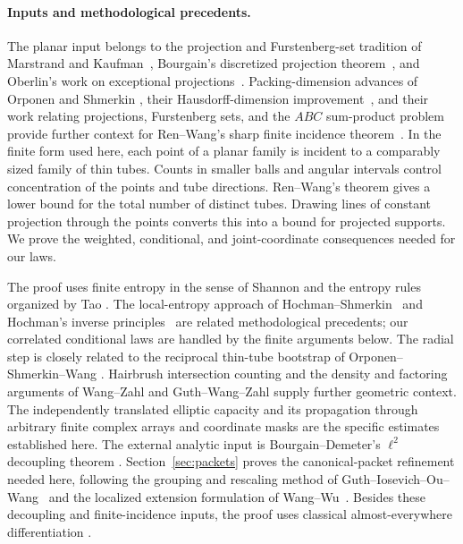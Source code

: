 \paragraph{Inputs and methodological precedents.}
The planar input belongs to the projection and Furstenberg-set
tradition of Marstrand and Kaufman~\cite{Marstrand1954,Kaufman1968},
Bourgain's discretized projection theorem~\cite{Bourgain2010}, and
Oberlin's work on exceptional projections~\cite{Oberlin2012}.
Packing-dimension advances of Orponen and Shmerkin
\cite{Orponen2020Packing,Shmerkin2022Packing}, their Hausdorff-dimension
improvement~\cite{OrponenShmerkin2023Hausdorff}, and their work relating
projections, Furstenberg sets, and the $ABC$ sum-product problem
\cite{OrponenShmerkin2026ABC} provide further context for Ren--Wang's
sharp finite incidence theorem~\cite{RenWang2023}. In the finite form
used here, each point of a planar family is incident to a comparably
sized family of thin tubes. Counts in smaller balls and angular
intervals control concentration of the points and tube directions.
Ren--Wang's theorem gives a lower bound for the total number of
distinct tubes. Drawing lines of constant projection through the
points converts this into a bound for projected supports. We prove
the weighted, conditional, and joint-coordinate consequences needed
for our laws.

The proof uses finite entropy in the sense of Shannon
\cite{Shannon1948} and the entropy rules organized by Tao
\cite{Tao2010Entropy}. The local-entropy approach of
Hochman--Shmerkin~\cite{HochmanShmerkin2012} and Hochman's inverse
principles~\cite{Hochman2014} are related methodological precedents;
our correlated conditional laws are handled by the finite arguments
below. The radial step is closely related to the reciprocal thin-tube
bootstrap of Orponen--Shmerkin--Wang
\cite{OrponenShmerkinWang2024Radial}. Hairbrush intersection counting
\cite{Wolff1995Kakeya,TaoVargasVega1998} and the density and factoring
arguments of Wang--Zahl and Guth--Wang--Zahl
\cite{WangZahl2025Convex,GuthWangZahl2026} supply further geometric
context. The independently translated elliptic capacity and its
propagation through arbitrary finite complex arrays and coordinate
masks are the specific estimates established here. The external
analytic input is Bourgain--Demeter's $\ell^2$ decoupling theorem
\cite{BourgainDemeter2015}. Section~\ref{sec:packets} proves the
canonical-packet refinement needed here, following the grouping and
rescaling method of Guth--Iosevich--Ou--Wang~\cite{GIOW2020} and
the localized extension formulation of Wang--Wu~\cite{WangWu2024}.
Besides these decoupling and finite-incidence inputs, the proof uses
classical almost-everywhere differentiation
\cite{Tao2011Measure,Heinonen2005Lipschitz}.

